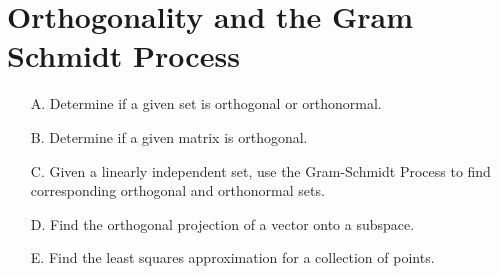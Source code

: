 \section{Orthogonality and the Gram Schmidt Process}

\begin{outcome}

\begin{enumerate}

\item[A.] Determine if a given set is orthogonal or orthonormal.

\item[B.] Determine if a given matrix is orthogonal.

\item[C.] Given a linearly independent set, use the Gram-Schmidt Process to find corresponding orthogonal and orthonormal sets. 

\item[D.] Find the orthogonal projection of a vector onto a subspace.

\item[E.] Find the least squares approximation for a collection of points.
\end{enumerate}
\end{outcome}
